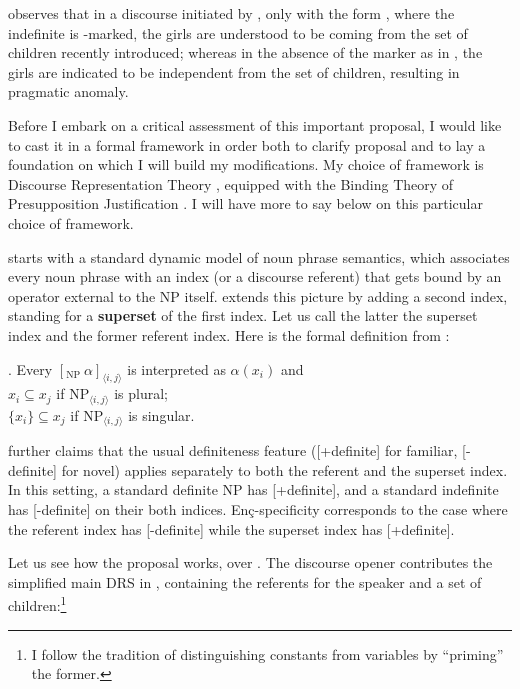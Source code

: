 \documentclass[11pt,a4paper]{article}
\newcommand{\encspec}{Enç-specific}
\begin{document}
 observes that in a discourse initiated by
, only with the form , where the
indefinite  is \acc-marked, the girls are
understood to be coming from the set of children recently introduced;
whereas in the absence of the marker as in , the girls
are indicated to be independent from the set of children,
resulting in pragmatic anomaly. 


Before I embark on a critical assessment of this important proposal, I
would like to cast it in a formal framework in order both to clarify
 proposal and to lay a foundation on which I will build
my modifications. My choice of framework is Discourse Representation
Theory , equipped with the Binding Theory
of Presupposition Justification . I will have
more to say below on this particular choice of framework.

\citeauthor{enc91} starts with a standard dynamic model of noun phrase
semantics, which associates every noun phrase with an index (or a
discourse referent) that gets bound by an operator external to the NP
itself. \citeauthor{enc91} extends this picture by adding a second
index, standing for a \textbf{superset} of the first index.  Let us
call the latter the superset index and the former referent index.
Here is the formal definition from :

\ex.\label{encform} Every $[_{\text{NP}}\  \alpha ]_{\langle i,j\rangle}$ is interpreted as
$\alpha(x_i)$ and\\
$x_i \subseteq x_j$ if $\text{NP}_{\langle i,j\rangle}$ is plural;\\
$\{x_i\} \subseteq x_j$ if $\text{NP}_{\langle i,j\rangle}$ is
singular.

 further claims that the usual definiteness feature
([+definite] for familiar, [-definite] for novel) applies separately
to both the referent and the superset index. In this setting, a
standard definite NP has [+definite], and a standard indefinite has
[-definite] on their both indices.  \encspec{ity} corresponds to the
case where the referent index has [-definite] while the superset index
has [+definite].

Let us see how the proposal works, over . The discourse
opener  contributes the simplified main DRS in
, containing the referents for the speaker and a
set of children:\footnote{I follow the tradition of distinguishing
constants from variables by ``priming'' the former.}
\end{document}
